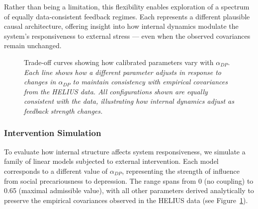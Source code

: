 \documentclass[
]{article}
\begin{document}
Rather than being a limitation, this flexibility enables exploration of
a spectrum of equally data-consistent feedback regimes. Each represents
a different plausible causal architecture, offering insight into how
internal dynamics modulate the system's responsiveness to external
stress --- even when the observed covariances remain unchanged.

\begin{figure}


\caption{\label{fig-tradeoff}Trade-off curves showing how calibrated
parameters vary with \(\alpha_{DP}\). \emph{Each line shows how a
different parameter adjusts in response to changes in \(\alpha_{DP}\) to
maintain consistency with empirical covariances from the HELIUS data.
All configurations shown are equally consistent with the data,
illustrating how internal dynamics adjust as feedback strength
changes.}}

\end{figure}%

\subsubsection{Intervention Simulation}\label{intervention-simulation}

To evaluate how internal structure affects system responsiveness, we
simulate a family of linear models subjected to external intervention.
Each model corresponds to a different value of \(\alpha_{DP}\),
representing the strength of influence from social precariousness to
depression. The range spans from 0 (no coupling) to 0.65 (maximal
admissible value), with all other parameters derived analytically to
preserve the empirical covariances observed in the HELIUS data (see
Figure~\ref{fig-tradeoff}).
\end{document}
